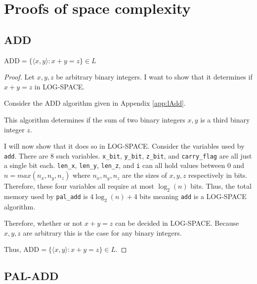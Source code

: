\documentclass[11pt, a4paper]{article}
\begin{document}


\newpage

\section{Proofs of space complexity}\label{app:proofs}

\subsection{ADD}

\begin{theorem} \label{thrm:add}
    \(\text{ADD} = \{\langle x, y \rangle : x + y = z\} \in L\)
\end{theorem}

\begin{proof}
    Let \(x, y, z\) be arbitrary binary integers.
    I want to show that it determines if \(x + y = z\) in LOG-SPACE.

    Consider the ADD algorithm given in Appendix \ref{app:lAdd}.

    This algorithm determines if the sum of two binary integers \(x, y\) is a third binary integer \(z\).

    I will now show that it does so in LOG-SPACE.
    Consider the variables used by \lstinline|add|.
    There are \(8\) such variables.
    \lstinline|x_bit|, \lstinline|y_bit|, \lstinline|z_bit|, and \lstinline|carry_flag| are all just a single bit each.
    \lstinline|len_x|, \lstinline|len_y|, \lstinline|len_z|, and \lstinline|i| can all hold values between \(0\) and \(n = max(n_x, n_y, n_z)\) where \(n_x, n_y, n_z\) are the sizes of \(x, y, z\) respectively in bits.
    Therefore, these four variables all require at most \(\log_2(n)\) bits.
    Thus, the total memory used by \lstinline|pal_add| is \(4\log_2(n) + 4\) bits meaning \lstinline|add| is a LOG-SPACE algorithm.

    Therefore, whether or not \(x + y = z\) can be decided in LOG-SPACE.
    Because \(x, y, z\) are arbitrary this is the case for any binary integers.
    
    Thus, \(\text{ADD} = \{\langle x, y \rangle : x + y = z\} \in L\).
\end{proof}

\subsection{PAL-ADD}
\end{document}
